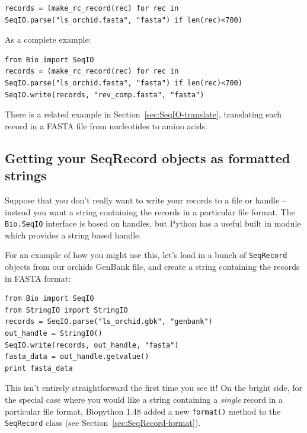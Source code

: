 \documentclass{report}
\begin{document}
\begin{verbatim}
records = (make_rc_record(rec) for rec in SeqIO.parse("ls_orchid.fasta", "fasta") if len(rec)<700)
\end{verbatim}

As a complete example:

\begin{verbatim}
from Bio import SeqIO
records = (make_rc_record(rec) for rec in SeqIO.parse("ls_orchid.fasta", "fasta") if len(rec)<700)
SeqIO.write(records, "rev_comp.fasta", "fasta")
\end{verbatim}

There is a related example in Section~\ref{sec:SeqIO-translate}, translating each
record in a FASTA file from nucleotides to amino acids.

\subsection{Getting your SeqRecord objects as formatted strings}
\label{sec:Bio.SeqIO-and-StringIO}
Suppose that you don't really want to write your records to a file or handle -- instead you want a string containing the records in a particular file format.  The \verb|Bio.SeqIO| interface is based on handles, but Python has a useful built in module which provides a string based handle.

For an example of how you might use this, let's load in a bunch of \verb|SeqRecord| objects from our orchids GenBank file, and create a string containing the records in FASTA format:

\begin{verbatim}
from Bio import SeqIO
from StringIO import StringIO
records = SeqIO.parse("ls_orchid.gbk", "genbank")
out_handle = StringIO()
SeqIO.write(records, out_handle, "fasta")
fasta_data = out_handle.getvalue()
print fasta_data
\end{verbatim}

This isn't entirely straightforward the first time you see it!  On the bright side, for the special case where you would like a string containing a \emph{single} record in a particular file format, Biopython 1.48 added a new \verb|format()| method to the \verb|SeqRecord| class (see Section~\ref{sec:SeqRecord-format}).
\end{document}
